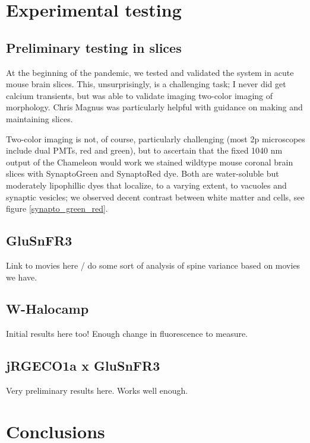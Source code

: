 \documentclass[a4paper,12pt]{article}
\begin{document}
\section{Experimental testing}

\subsection{Preliminary testing in slices}

At the beginning of the pandemic, we tested and validated the system in acute mouse brain slices.  This, unsurprisingly, is a challenging task; I never did get calcium transients, but was able to validate imaging two-color imaging of morphology. Chris Magnus was particularly helpful with guidance on making and maintaining slices. 

Two-color imaging is not, of course, particularly challenging (most 2p microscopes include dual PMTs, red and green), but to ascertain that the fixed 1040 nm output of the Chameleon would work we stained wildtype mouse coronal brain slices with SynaptoGreen and SynaptoRed dye.  Both are water-soluble but moderately lipophillic dyes that localize, to a varying extent, to vacuoles and synaptic vesicles; we observed decent contrast between white matter and cells, see figure \ref{synapto_green_red}. 


\subsection{GluSnFR3}

Link to movies here / do some sort of analysis of spine variance based on movies we have. 

\subsection{W-Halocamp}

Initial results here too!  Enough change in fluorescence to measure.  

\subsection{jRGECO1a x GluSnFR3}

Very preliminary results here.  Works well enough.

\section{Conclusions}
\end{document}
